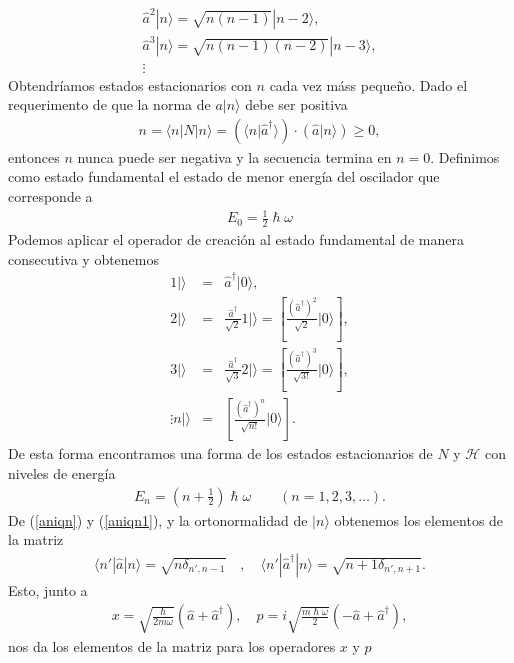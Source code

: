\documentclass[letterpaper,12pt,oneside]{book}
\begin{document}
%
\begin{eqnarray}
\hat a^2|n\rangle = \sqrt{n(n-1)}|n-2\rangle,\\
\hat a^3|n\rangle = \sqrt{n(n-1)(n-2)}|n-3\rangle,\\
\vdots\nonumber
\end{eqnarray}
%
Obtendr\'iamos estados estacionarios con $n$ cada vez m\'ass pequeño. Dado el requerimento de que la norma de $a|n\rangle$ debe ser positiva
%
\begin{eqnarray}
n=\langle n|N|n\rangle = (\langle n|\hat a^\dagger \rangle)\cdot (\hat a|n\rangle)\geq 0,
\end{eqnarray}
%
entonces $n$ nunca puede ser negativa y la secuencia termina en $n=0$.
%
Definimos como estado fundamental el estado de menor energ\'ia del oscilador que corresponde a 
%
\begin{eqnarray}
E_0 = \frac{1}{2}\hslash \omega
\end{eqnarray}
%
Podemos aplicar el operador de creaci\'on al estado fundamental de manera consecutiva y obtenemos
%
\begin{eqnarray}
1|\rangle &=& \hat a^\dagger|0\rangle,\\
2|\rangle &=& \frac{\hat a^\dagger}{\sqrt{2}}1|\rangle =\left[\frac{(\hat a^\dagger)^2}{\sqrt{2}}|0\rangle \right],\\
3|\rangle &=& \frac{\hat a^\dagger}{\sqrt{3}}2|\rangle =\left[\frac{(\hat a^\dagger)^3}{\sqrt{3!}}|0\rangle \right],\\
\vdots
n|\rangle &=& \left[\frac{(\hat a^\dagger)^n}{\sqrt{n!}}|0\rangle \right].
\end{eqnarray}
%
De esta forma encontramos una forma de los estados estacionarios de $N$ y $\mathcal{H}$ con niveles de energ\'ia
%
\begin{eqnarray}
E_n = (n+\frac{1}{2})\hslash \omega \qquad (n=1,2,3,\dots).
\end{eqnarray}
%
De (\ref{aniqn}) y (\ref{aniqn1}), y la ortonormalidad de $|n\rangle$ obtenemos los elementos de la matriz
%
\begin{eqnarray}
\langle	n'|\hat a|n \rangle = \sqrt{n\delta_{n',n-1}}\quad , \quad \langle n'|\hat a^\dagger |n \rangle = \sqrt{n+1\delta_{n',n+1}}.
\end{eqnarray}
%
Esto, junto a
%
\begin{eqnarray}
x=\sqrt{\frac{\hslash}{2m\omega }}(\hat a + \hat a^\dagger), \quad  p=i\sqrt{\frac{m\hslash\omega}{2}}(-\hat a + \hat a^\dagger),
\end{eqnarray}
%
nos da los elementos de la matriz para los operadores $x$ y $p$
\end{document}
